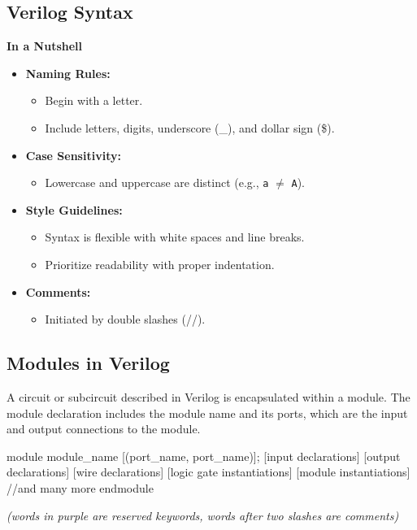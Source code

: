 \documentclass[12pt,openany, tikz,border=10pt]{book}
\begin{document}
\subsection{Verilog Syntax}
\textbf{In a Nutshell}
\begin{itemize}
    \item[] \textbf{Naming Rules:}
    \begin{itemize}
      \item[] Begin with a letter.
      \item[] Include letters, digits, underscore (\_), and dollar sign (\$).
    \end{itemize}
  
    \item[] \textbf{Case Sensitivity:}
    \begin{itemize}
      \item[] Lowercase and uppercase are distinct (e.g., \texttt{a} $\neq$ \texttt{A}).
    \end{itemize}
  
    \item[] \textbf{Style Guidelines:}
    \begin{itemize}
      \item[] Syntax is flexible with white spaces and line breaks.
      \item[] Prioritize readability with proper indentation.
    \end{itemize}
  
    \item[] \textbf{Comments:}
    \begin{itemize}
      \item[] Initiated by double slashes (//).
    \end{itemize}
  \end{itemize}

  \subsection{Modules in Verilog}
A circuit or subcircuit described in Verilog is encapsulated within a module. The module declaration includes the module name and its ports, which are the input and output connections to the module.
\begin{vhdl}
    module module_name [(port_name{, port_name})];
        [input declarations]
        [output declarations]
        [wire declarations]
        [logic gate instantiations]
        [module instantiations]
    //and many more
    endmodule
\end{vhdl}
\textit{(words in purple are reserved keywords, words after two slashes are comments)} 
\newpage 
\end{document}
